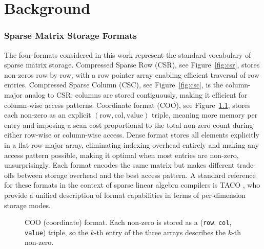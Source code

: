 \chapter{Background}
\label{ch:background}

\subsection{Sparse Matrix Storage Formats}
The four formats considered in this work represent the standard vocabulary of sparse
matrix storage. Compressed Sparse Row (CSR), see Figure~\ref{fig:csr}, stores non-zeros row by row, with a row
pointer array enabling efficient traversal of row entries.
Compressed Sparse Column (CSC), see Figure~\ref{fig:csc}, is the column-major analog to CSR; columns are stored
contiguously, making it efficient for column-wise access patterns. Coordinate format
(COO), see Figure~\ref{fig:coo}, stores each non-zero as an explicit $(\text{row}, \text{col}, \text{value})$
triple, meaning more memory per entry and
imposing a scan cost proportional to the total non-zero count during either row-wise or column-wise access.
Dense format stores all elements explicitly in a flat row-major array, eliminating
indexing overhead entirely and making any access pattern possible, making it optimal
when most entries are non-zero, unsurprisingly. Each format encodes the same matrix
but makes different trade-offs between storage overhead and the best access pattern.
A standard reference for these formats in the context of sparse linear algebra
compilers is TACO \cite{taco_formats}, who provide a unified description of
format capabilities in terms of per-dimension storage modes.

\begin{figure}[htbp]
  \centering
  \caption{COO (coordinate) format. Each non-zero is stored as a
  (\texttt{row}, \texttt{col}, \texttt{value}) triple, so the $k$-th entry of the
  three arrays describes the $k$-th non-zero.}
  \label{fig:coo}
\end{figure}

